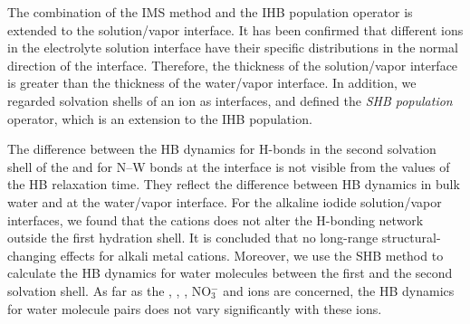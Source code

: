 The combination of the IMS method and the IHB population operator is extended to the solution/vapor interface. 
It has been confirmed that different ions in the electrolyte solution interface have their specific distributions in the normal direction of the interface. 
Therefore, the thickness of the solution/vapor interface is greater than the thickness of the water/vapor interface. 
In addition, we regarded solvation shells of an ion as interfaces, 
and defined the \emph{SHB population} operator, which is an extension to the IHB population.

The difference between the HB dynamics for H-bonds in the second solvation shell of the \Li and for N--W bonds 
at the interface is not visible from the values of the HB relaxation time. They reflect the difference between HB dynamics in 
bulk water and at the water/vapor interface. For the alkaline iodide solution/vapor interfaces, we found 
that the cations does not alter the H-bonding network outside the first hydration shell. 
It is concluded that no long-range structural-changing effects for alkali metal cations.
Moreover, we use the SHB method to calculate the HB dynamics for water molecules between the first and the second solvation shell.
As far as the \Li, \Na, \K, NO$^-_3$ and \I ions are concerned, 
the HB dynamics for water molecule pairs does not vary significantly with these ions.

